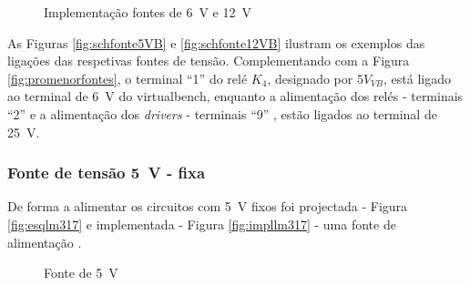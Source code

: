 \begin{figure}[hbtp]
	\centering%
		\centering
		\qquad
		\caption{Implementação fontes de \SI{6}{\volt} e \SI{12}{\volt}}%
		\label{fig:fontes6-12}%
	\end{figure}

As Figuras \ref{fig:schfonte5VB} e \ref{fig:schfonte12VB} ilustram os exemplos das ligações das respetivas fontes de tensão. Complementando com a Figura \ref{fig:promenorfontes}, o terminal ``1'' do relé $K_{4}$, designado por $5V_{VB}$, está ligado ao terminal de \SI{6}{\volt} do \acrshort{virtualbench}, enquanto a alimentação dos relés -  terminais ``2'' e a alimentação dos \textit{drivers} -  terminais ``9'' , estão ligados ao terminal de \SI{25}{\volt}. 

\subsubsection{Fonte de tensão \SI{5}{\volt} - fixa}
De forma a alimentar os circuitos com \SI{5}{\volt} fixos foi projectada - Figura \ref{fig:esqlm317} e implementada - Figura \ref{fig:impllm317} - uma fonte de alimentação \cite{LM317}.

\begin{figure}[hbtp]
	\centering%
		\centering
		\qquad
		\caption{Fonte de \SI{5}{\volt} }%
		\label{fig:fonte5V}%
	\end{figure}

